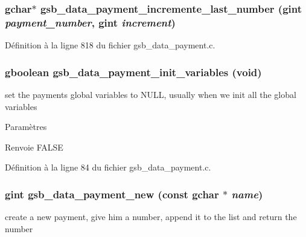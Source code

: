 \subsubsection[{gsb\_\-data\_\-payment\_\-incremente\_\-last\_\-number}]{\setlength{\rightskip}{0pt plus 5cm}gchar$\ast$ gsb\_\-data\_\-payment\_\-incremente\_\-last\_\-number (gint {\em payment\_\-number}, \/  gint {\em increment})}\label{gsb__data__payment_8c_a15adc3fcd792571b25cfef5fd1779bd6}


Définition à la ligne 818 du fichier gsb\_\-data\_\-payment.c.

\subsubsection[{gsb\_\-data\_\-payment\_\-init\_\-variables}]{\setlength{\rightskip}{0pt plus 5cm}gboolean gsb\_\-data\_\-payment\_\-init\_\-variables (void)}\label{gsb__data__payment_8c_ab3a02cace81e02ece354b3b1579156f2}
set the payments global variables to NULL, usually when we init all the global variables


\begin{DoxyParams}{Paramètres}
\item[{\em }]\end{DoxyParams}
\begin{DoxyReturn}{Renvoie}
FALSE 
\end{DoxyReturn}


Définition à la ligne 84 du fichier gsb\_\-data\_\-payment.c.

\subsubsection[{gsb\_\-data\_\-payment\_\-new}]{\setlength{\rightskip}{0pt plus 5cm}gint gsb\_\-data\_\-payment\_\-new (const gchar $\ast$ {\em name})}\label{gsb__data__payment_8c_a839e324a76bf9095b680b6e94d76f4b7}
create a new payment, give him a number, append it to the list and return the number


